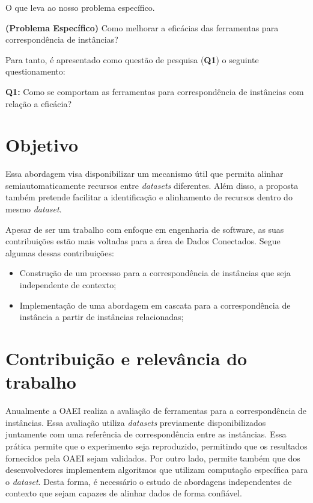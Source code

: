 O que leva ao nosso problema específico.

\textbf{(Problema Específico)} Como melhorar a eficácias das ferramentas para correspondência
de instâncias?

Para tanto, é apresentado como questão de pesquisa (\textbf{Q1}) o seguinte questionamento:

\textbf{Q1:} Como se comportam as ferramentas para correspondência de instâncias com relação a eficácia?

\section{Objetivo}


Essa abordagem visa disponibilizar um mecanismo útil que permita alinhar semiautomaticamente recursos entre \textit{datasets} diferentes. Além disso, a proposta também pretende facilitar a identificação e alinhamento de recursos dentro do mesmo \textit{dataset}. 

Apesar de ser um trabalho com enfoque em engenharia de software, as suas contribuições estão mais voltadas para a área de Dados Conectados. Segue algumas dessas contribuições:

\begin{itemize}
        \item Construção de um processo para a correspondência de instâncias que seja independente de contexto;
        \item Implementação de uma abordagem em cascata para a correspondência de instância a partir de instâncias relacionadas;
\end{itemize}

\section{Contribuição e relevância do trabalho}
\label{contribuicao}
Anualmente a OAEI realiza a avaliação de ferramentas para a correspondência de instâncias. Essa avaliação utiliza \textit{datasets} previamente disponibilizados juntamente com uma referência de correspondência entre as instâncias. Essa prática permite que o experimento seja reproduzido, permitindo que os resultados fornecidos pela OAEI sejam validados. Por outro lado, permite também que dos desenvolvedores implementem algoritmos que utilizam computação específica para o \textit{dataset}. Desta forma, é necessário o estudo de abordagens independentes de contexto que sejam capazes de alinhar dados de forma confiável.

